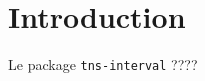 \documentclass[12pt,a4paper]{article}
\begin{document}
\section{Introduction}

Le package \verb#tns-interval# ????
\end{document}
